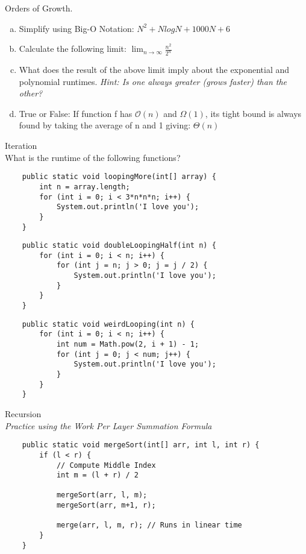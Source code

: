 \documentclass[11pt,letterpaper]{article}
\begin{document}


\problem Orders of Growth. 
\begin{enumerate}[(a)]
    \item Simplify using Big-O Notation: $N^{2} + NlogN + 1000N + 6$
    \pspace
    \pspace
    \pspace
    \pspace
    \pspace
    \item Calculate the following limit:
    $\lim_{n \to \infty} \frac{n^{2}}{2^{n}}$
    \pspace
    \pspace
    \pspace
    \pspace
    \pspace
    \item What does the result of the above limit imply about the exponential and polynomial runtimes. 
    \textit{Hint: Is one always greater (grows faster) than the other?}
    \pspace
    \pspace
    \pspace
    \pspace
    \pspace
    \item True or False: If function f has $\mathcal{O}(n)$ and $\Omega(1)$, its tight bound is always found by taking the average of n and 1 giving: $\Theta(n)$
    \pspace
    \pspace
    \pspace
    \pspace
    \pspace
\end{enumerate}
\pspace
\newpage


\problem Iteration
\\ 
What is the runtime of the following functions?
\begin{lstlisting}
    public static void loopingMore(int[] array) {
        int n = array.length;
        for (int i = 0; i < 3*n*n*n; i++) {
            System.out.println('I love you');
        }
    }
\end{lstlisting}
\pspace
\pspace
\pspace
\pspace
\begin{lstlisting}
    public static void doubleLoopingHalf(int n) {
        for (int i = 0; i < n; i++) {
            for (int j = n; j > 0; j = j / 2) {
                System.out.println('I love you');
            }
        }
    }
\end{lstlisting}
\pspace
\pspace
\pspace
\pspace

\begin{lstlisting}
    public static void weirdLooping(int n) {
        for (int i = 0; i < n; i++) {
            int num = Math.pow(2, i + 1) - 1;
            for (int j = 0; j < num; j++) {
                System.out.println('I love you');
            }
        }
    }
\end{lstlisting}
\pspace
\pspace
\pspace
\pspace
\pspace
\newpage


\problem Recursion
\\
\textit{Practice using the Work Per Layer Summation Formula}
\begin{lstlisting}
    public static void mergeSort(int[] arr, int l, int r) {
        if (l < r) {
            // Compute Middle Index
            int m = (l + r) / 2
            
            mergeSort(arr, l, m);
            mergeSort(arr, m+1, r);
            
            merge(arr, l, m, r); // Runs in linear time 
        }
    }
\end{lstlisting}
\pspace
\pspace
\pspace
\pspace
\end{document}
